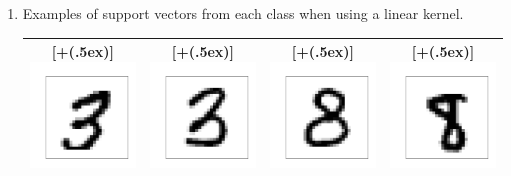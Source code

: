 \documentclass{article}
\newcommand*{\addheight}[2][.5ex]{%
  \raisebox{0pt}[\dimexpr\height+(#1)\relax]{#2}%
}
\begin{document}
\begin{enumerate}
\item
Examples of support vectors from each class when using a linear kernel.
\begin{table}[H]
\centering
\begin{tabular}{|c|c|c|c|}
	\hline
	\addheight{\includegraphics[width=40mm]{images/3a.png}} &
	\addheight{\includegraphics[width=40mm]{images/3b.png}} &  
    \addheight{\includegraphics[width=40mm]{images/8a.png}} &
    \addheight{\includegraphics[width=40mm]{images/8b.png}} \\
    \hline 
\end{tabular}
\end{table}
\end{enumerate}
\end{document}
